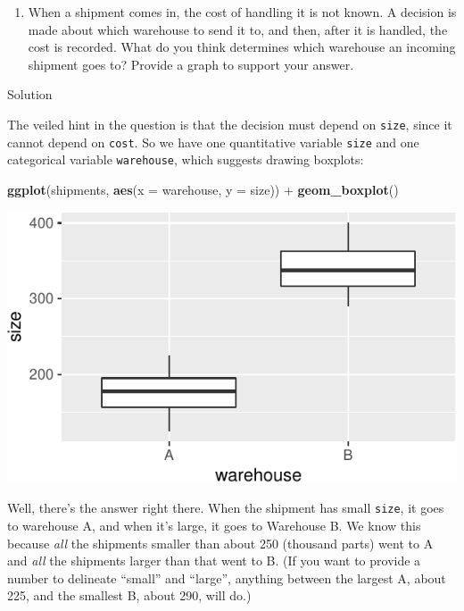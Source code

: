 \documentclass[]{tufte-book}
\newenvironment{Shaded}{}{}
\newcommand{\DataTypeTok}[1]{\textcolor[rgb]{0.56,0.13,0.00}{#1}}
\newcommand{\KeywordTok}[1]{\textcolor[rgb]{0.00,0.44,0.13}{\textbf{#1}}}
\newcommand{\NormalTok}[1]{#1}
\newcommand{\OperatorTok}[1]{\textcolor[rgb]{0.40,0.40,0.40}{#1}}
\newcommand{\StringTok}[1]{\textcolor[rgb]{0.25,0.44,0.63}{#1}}
\providecommand{\tightlist}{%
  \setlength{\itemsep}{0pt}\setlength{\parskip}{0pt}}
\theoremstyle{definition}
\theoremstyle{definition}
\theoremstyle{definition}
\theoremstyle{remark}
\begin{document}
\begin{enumerate}
\def\labelenumi{(\alph{enumi})}
\setcounter{enumi}{3}
\tightlist
\item
  When a shipment comes in, the cost of handling it is not known. A
  decision is made about which warehouse to send it to, and then, after
  it is handled, the cost is recorded. What do you think determines
  which warehouse an incoming shipment goes to? Provide a graph to
  support your answer.
\end{enumerate}

Solution

The veiled hint in the question is that the decision must depend on
\texttt{size}, since it cannot depend on \texttt{cost}. So we have one
quantitative variable \texttt{size} and one categorical variable
\texttt{warehouse}, which suggests drawing boxplots:

\begin{Shaded}
\begin{Highlighting}[]
\KeywordTok{ggplot}\NormalTok{(shipments, }\KeywordTok{aes}\NormalTok{(}\DataTypeTok{x =}\NormalTok{ warehouse, }\DataTypeTok{y =}\NormalTok{ size)) }\OperatorTok{+}\StringTok{ }
\StringTok{    }\KeywordTok{geom_boxplot}\NormalTok{()}
\end{Highlighting}
\end{Shaded}

\includegraphics{02-reading-in_files/figure-latex/unnamed-chunk-24-1}

Well, there's the answer right there. When the shipment has small
\texttt{size}, it goes to warehouse A, and when it's large, it goes to
Warehouse B. We know this because \emph{all} the shipments smaller than
about 250 (thousand parts) went to A and \emph{all} the shipments larger
than that went to B. (If you want to provide a number to delineate
``small'' and ``large'', anything between the largest A, about 225, and
the smallest B, about 290, will do.)
\end{document}
